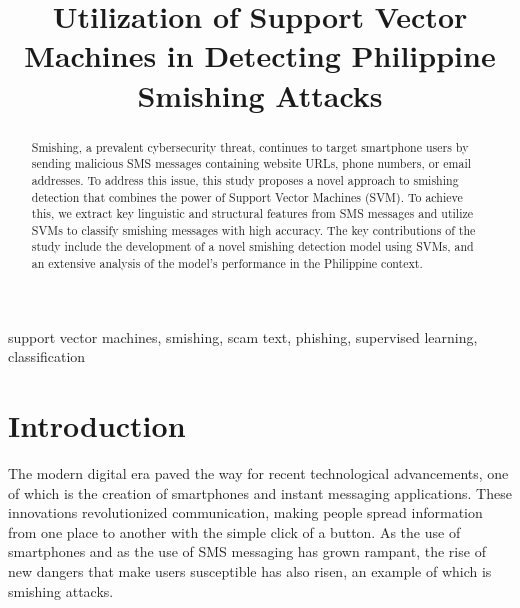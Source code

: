 \documentclass[conference]{IEEEtran}
\begin{document}
\title{Utilization of Support Vector Machines in Detecting Philippine Smishing Attacks}

\author{
\and
{}
\and
{}
}

\maketitle

\begin{abstract}
    Smishing, a prevalent cybersecurity threat, continues to target smartphone users by sending malicious SMS messages containing website URLs, phone numbers, or email addresses. To address this issue, this study proposes a novel approach to smishing detection that combines the power of Support Vector Machines (SVM). To achieve this, we extract key linguistic and structural features from SMS messages and utilize SVMs to classify smishing messages with high accuracy. The key contributions of the study include the development of a novel smishing detection model using SVMs, and an extensive analysis of the model's performance in the Philippine context. 
\end{abstract}

\begin{IEEEkeywords}
support vector machines, smishing, scam text, phishing, supervised learning, classification
\end{IEEEkeywords}

\section{Introduction}

The modern digital era paved the way for recent technological advancements, one of which is the creation of smartphones and instant messaging applications. These innovations revolutionized communication, making people spread information from one place to another with the simple click of a button. As the use of smartphones and as the use of SMS messaging has grown rampant, the rise of new dangers that make users susceptible has also risen, an example of which is smishing attacks.
\end{document}
